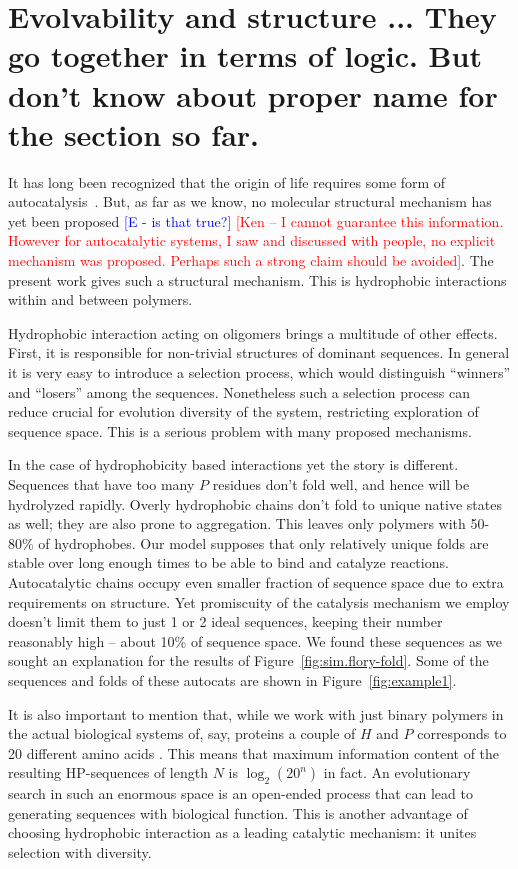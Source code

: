 \documentclass[journal=jacsat,manuscript=article,layout=twocolumn]{achemso}
\newcommand*{\red}[1]{\textcolor{red}{#1}}
\newcommand*{\blue}[1]{\textcolor{blue}{#1}}
\begin{document}
\section{Evolvability and structure ... They go together in terms of logic. But don't know about 
proper name for the section so far.}
 It has long been recognized that the origin of life requires some form of 
autocatalysis~\cite{Kauffman1986,Dyson1985,Eigen1978}.  But, as far as we know, no molecular 
structural mechanism has yet been proposed \blue{[E - is that true?]} \red{[Ken -- I cannot 
guarantee this information. However for autocatalytic systems, I saw and discussed with people, 
no explicit mechanism was proposed. Perhaps such a strong claim should be 
avoided]}.  The present work gives such a 
structural mechanism. This is hydrophobic interactions within and between polymers.

Hydrophobic interaction acting on oligomers brings a multitude of other effects. First, it is 
responsible for non-trivial structures of dominant sequences. In general it is very easy to 
introduce a selection process, which would distinguish ``winners'' and ``losers'' among the 
sequences. Nonetheless such a selection process can reduce crucial for evolution diversity of the 
system,  restricting exploration of sequence space. This is a serious problem with many proposed 
mechanisms.

In the case of hydrophobicity based interactions yet the story is different. Sequences that have 
too many $P$ residues don't fold well, and hence will be hydrolyzed rapidly.  Overly hydrophobic 
chains don't fold to unique native states as well; they are also prone to aggregation. This leaves 
only polymers with 50-80\% of hydrophobes. 
Our model supposes that only relatively unique folds are stable over long enough times to be able 
to bind and catalyze reactions.  Autocatalytic chains occupy even smaller fraction of 
sequence space due to extra requirements on structure. Yet promiscuity of the catalysis mechanism 
we employ doesn't limit them to just 1 or 2 ideal sequences, keeping their number reasonably high 
-- about 10\% of sequence space.  We found these sequences as we sought an explanation for 
the results of Figure~\ref{fig:sim.flory-fold}.  Some of the sequences and folds of these autocats 
are shown in Figure~\ref{fig:example1}.

It is also important to mention that, while we work with just binary polymers in the actual 
biological systems of, say, proteins a couple of $H$ and $P$ corresponds to 20 different amino 
acids . This means that maximum information content of the resulting HP-sequences of length $N$ is 
$\log_2(20^n)$ in fact. An evolutionary search in such an enormous space is an open-ended process 
that can lead to generating sequences with biological function. This is another advantage of 
choosing hydrophobic interaction as a leading catalytic mechanism: it unites selection with 
diversity.
\end{document}
